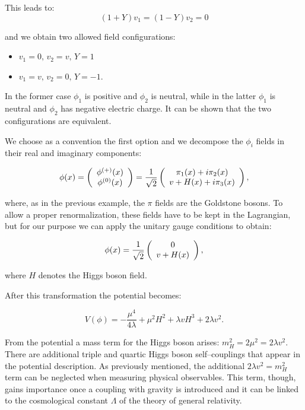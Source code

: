 This leads to:
\begin{equation}
(1+Y)v_1 = (1-Y)v_2 = 0
\end{equation}

and we obtain two allowed field configurations:

\begin{itemize}
\item $v_1 = 0, \, v_2 = v, \, Y = 1$
\item $v_1 = v, \, v_2 = 0, \, Y = -1$.
\end{itemize}

In the former case $\phi_1$ is positive and $\phi_2$ is neutral, while in the latter $\phi_1$ is neutral and $\phi_2$ has negative electric charge. It can be shown that the two configurations are equivalent. %

We choose as a convention the first option and we decompose the $\phi_i$ fields in their real and imaginary components:

\begin{equation}
\phi(x) = \left(\begin{array}{c}\phi^{(+)}(x) \\\phi^{(0)}(x)\end{array}\right) = \dfrac{1}{\sqrt{2}} \left(\begin{array}{c} \pi_1(x) + i \pi_2(x)  \\ v + H(x) + i \pi_3(x) \end{array}\right),
\end{equation}

where, as in the previous example, the $\pi$ fields are the Goldstone bosons.  To allow a proper renormalization, these fields have to be kept in the Lagrangian, but for our purpose we can apply the unitary gauge conditions to obtain:

\begin{equation}
\phi(x) = \dfrac{1}{\sqrt{2}} \left(\begin{array}{c} 0  \\ v + H(x) \end{array}\right),
\end{equation}

where $H$ denotes the Higgs boson field.

After this transformation the potential becomes:

\begin{equation}
V(\phi) = -\dfrac{\mu^4}{4\lambda} + \mu^2H^2 + \lambda v H^3 + 2 \lambda v^2.
\end{equation}

From the potential a mass term for the Higgs boson arises: $m^{2}_H = 2\mu^2 = 2 \lambda v^2$. There are additional triple and quartic Higgs boson self--couplings that appear in the potential description. As previously mentioned, the additional $2 \lambda v^2 = m^{2}_H$ term can be neglected when measuring physical observables. This term, though, gains importance once a coupling with gravity is introduced and it can be linked to the cosmological constant $\Lambda$ of the theory of general relativity.

